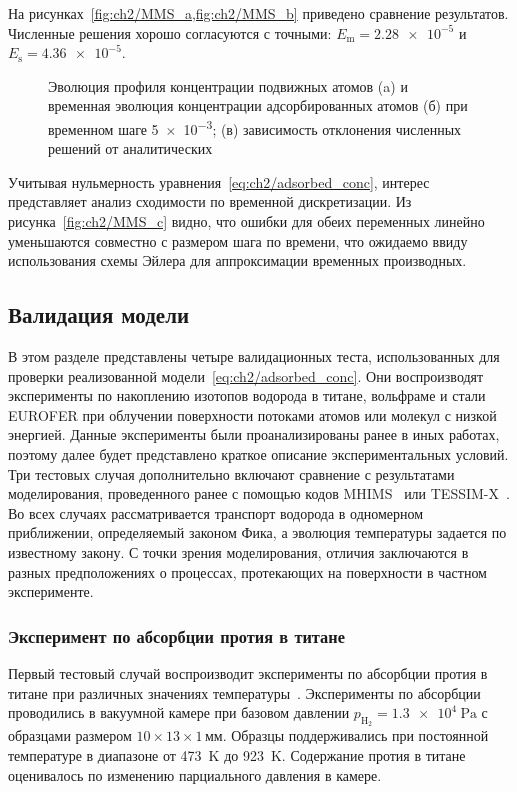 На рисунках~\cref{fig:ch2/MMS_a,fig:ch2/MMS_b} приведено сравнение результатов. Численные решения хорошо согласуются с точными: \(E_\mathrm{m} = \num{2.28e-5} \) и \( E_\mathrm{s}= \num{4.36e-5} \).
\begin{figure}[ht]
    \caption{Эволюция профиля концентрации подвижных атомов (a) и временная эволюция концентрации адсорбированных атомов (б) при временном шаге \num{5e-3}; (в) зависимость отклонения численных решений от аналитических}\label{fig:ch2/MMS}
\end{figure}
Учитывая нульмерность уравнения~\cref{eq:ch2/adsorbed_conc}, интерес представляет анализ сходимости по временной дискретизации. Из рисунка~\cref{fig:ch2/MMS_c} видно, что ошибки для обеих переменных линейно уменьшаются совместно с размером шага по времени, что ожидаемо ввиду использования схемы Эйлера для аппроксимации временных производных.

\subsection{Валидация модели}\label{sec:ch2/sec3/subsec2}

В этом разделе представлены четыре валидационных теста, использованных для проверки реализованной модели~\cref{eq:ch2/adsorbed_conc}. Они воспроизводят эксперименты по накоплению изотопов водорода в титане, вольфраме и стали EUROFER при облучении поверхности потоками атомов или молекул с низкой энергией. Данные эксперименты были проанализированы ранее в иных работах, поэтому далее будет представлено краткое описание экспериментальных условий. Три тестовых случая дополнительно включают сравнение с результатами моделирования, проведенного ранее с помощью кодов MHIMS~\cite{Hodille2024} или TESSIM-X~\cite{Schmid2023_2}. Во всех случаях рассматривается транспорт водорода в одномерном приближении, определяемый законом Фика, а эволюция температуры задается по известному закону. С точки зрения моделирования, отличия заключаются в разных предположениях о процессах, протекающих на поверхности в частном эксперименте.

\subsubsection{Эксперимент по абсорбции протия в титане}
Первый тестовый случай воспроизводит эксперименты по абсорбции протия в титане при различных значениях температуры~\cite{Hirooka1981}. Эксперименты по абсорбции проводились в вакуумной камере при базовом давлении $p_\mathrm{H_2}=\SI{1.3e4}{\pascal}$ с образцами размером $10\times13\times1$\,мм. Образцы поддерживались при постоянной температуре в диапазоне от \SI{473}{K} до \SI{923}{K}. Содержание протия в титане оценивалось по изменению парциального давления в камере.

